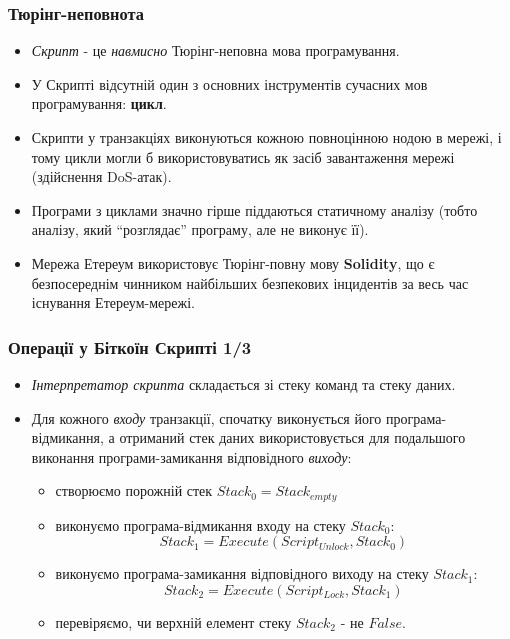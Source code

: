 \documentclass{beamer}
\begin{document}
\begin{frame}[fragile]
  \frametitle{Тюрінг-неповнота}
  \begin{itemize}
  \item \textit{Скрипт} - це \textit{навмисно} Тюрінг-неповна мова
    програмування.
  \item У Скрипті відсутній один з основних інструментів сучасних мов
    програмування: \textbf{цикл}.
  \item Скрипти у транзакціях виконуються кожною повноцінною нодою в мережі, і
    тому цикли могли б використовуватись як засіб завантаження мережі
    (здійснення DoS-атак).
  \item Програми з циклами значно гірше піддаються статичному аналізу (тобто
    аналізу, який ``розглядає'' програму, але не виконує її).
  \item Мережа Етереум використовує Тюрінг-повну мову \textbf{Solidity}, що є
    безпосереднім чинником найбільших безпекових інцидентів за весь час
    існування Етереум-мережі.
  \end{itemize}
\end{frame}

\begin{frame}[fragile]
  \frametitle{Операції у Біткоїн Скрипті 1/3}
  \begin{itemize}
  \item \textit{Інтерпретатор скрипта} складається зі стеку команд та стеку даних.
  \item Для кожного \textit{входу} транзакції, спочатку виконується його
    програма-відмикання, а отриманий стек даних використовується для подальшого
    виконання програми-замикання відповідного \textit{виходу}:
    \begin{itemize}
    \item створюємо порожній стек $Stack_0 = Stack_{empty}$
    \item виконуємо програма-відмикання входу на стеку $Stack_0$:
      $$Stack_1 = Execute(Script_{Unlock}, Stack_0)$$
    \item виконуємо програма-замикання відповідного виходу на стеку $Stack_1$:
      $$Stack_2 = Execute(Script_{Lock}, Stack_1)$$
    \item перевіряємо, чи верхній елемент стеку $Stack_2$ - не $False$.
    \end{itemize}
  \end{itemize}
\end{frame}
\end{document}
